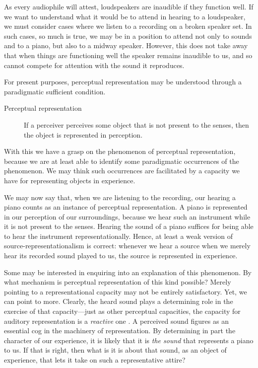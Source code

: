 \documentclass[sloppy, journal, git, bytitle, dodraft]{humapap}
\begin{document}
As every audiophile will attest, loudspeakers are inaudible if they function well. If we want to understand what it would be to attend in hearing to a loudspeaker, we must consider cases where we listen to a recording on a broken speaker set. In such cases, so much is true, we may be in a position to attend not only to sounds and to a piano, but also to a midway speaker. However, this does not take away that when things are functioning well the speaker remains inaudible to us, and so cannot compete for attention with the sound it reproduces.


\sect For present purposes, perceptual representation may be understood through a paradigmatic sufficient condition. 
\begin{description}
	\item[Perceptual representation] If a perceiver perceives some object that is not present to the senses, then the object is represented in perception.
\end{description}
With this we have a grasp on the phenomenon of perceptual representation, because we are at least able to identify some paradigmatic occurrences of the phenomenon. We may think such occurrences are facilitated by a capacity we have for representing objects in experience. 

We may now say that, when we are listening to the recording, our hearing a piano counts as an instance of perceptual representation. A piano is represented in our perception of our surroundings, because we hear such an instrument while it is not present to the senses. Hearing the sound of a piano suffices for being able to hear the instrument representationally. Hence, at least a weak version of source-representationalism is correct: whenever we hear a source when we merely hear its recorded sound played to us, the source is  represented in experience. 

Some may be interested in enquiring into an explanation of this phenomenon. By what mechanism is perceptual representation of this kind possible? Merely pointing to a representational capacity may not be entirely satisfactory. Yet, we can point to more. Clearly, the heard sound plays a determining role in the exercise of that capacity---just as other perceptual capacities, the capacity for auditory representation is a \emph{reactive} one \autocites[][]{nietzsche1887aa}[see][p. 4]{kalderon2012ab}. A perceived sound figures as an essential cog in the machinery of representation. By determining in part the character of our experience, it is likely that it is \emph{the sound} that represents a piano to us. If that is right, then what is it is about that sound, as an object of experience, that lets it take on such a representative attire? 
\end{document}
